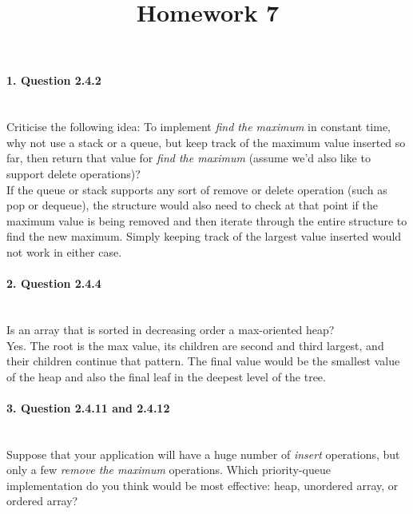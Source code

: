 \documentclass{article}
\begin{document}
\title{Homework 7}
\date{}
\maketitle



\paragraph{\Large 1. Question 2.4.2}\mbox{}\\
Criticise the following idea: To implement \textit{find the maximum} in constant time, why not use a stack or a queue, but keep track of the maximum value inserted so far, then return that value for \textit{find the maximum} (assume we'd also like to support delete operations)?\\

If the queue or stack supports any sort of remove or delete operation (such as pop or dequeue), the structure would also need to check at that point if the maximum value is being removed and then iterate through the entire structure to find the new maximum. Simply keeping track of the largest value inserted would not work in either case.

\paragraph{\Large 2. Question 2.4.4}\mbox{}\\
Is an array that is sorted in decreasing order a max-oriented heap?\\

Yes. The root is the max value, its children are second and third largest, and their children continue that pattern. The final value would be the smallest value of the heap and also the final leaf in the deepest level of the tree.

\paragraph{\Large 3. Question 2.4.11 and 2.4.12}\mbox{}\\
Suppose that your application will have a huge number of \textit{insert} operations, but only a few \textit{remove the maximum} operations. Which priority-queue implementation do you think would be most effective: heap, unordered array, or ordered array?\\
\end{document}
